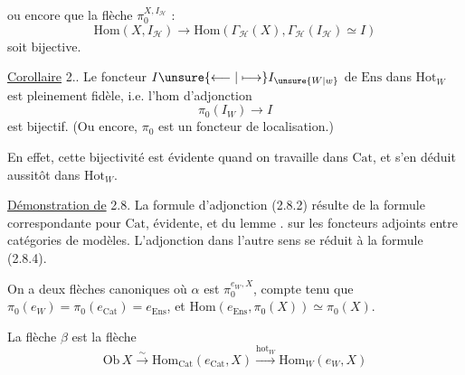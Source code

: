 
ou encore que la flèche $\pi_0^{X,I_{\mathcal H}}$ :
\[
\mathrm{Hom}(X,I_{\mathcal H})\longrightarrow\mathrm{Hom}(\Gamma_{\mathcal H}(X),\Gamma_{\mathcal H}(I_{\mathcal H})\simeq I)
\]
soit bijective.

\uline{Corollaire} 2..  Le foncteur $I\unsure{\longleftarrow|\longmapsto}I_{\unsure{W|w}}$ de $\mathrm{Ens}$ dans $\mathrm{Hot}_W$ est pleinement fidèle, i.e. l'hom d'adjonction
\[
\pi_0(I_W)\longrightarrow I
\]
est bijectif. (Ou encore, $\pi_0$ est un foncteur de localisation.)

En effet, cette bijectivité est  évidente quand on travaille dans $\mathrm{Cat}$, et s'en déduit aussitôt  dans $\mathrm{Hot}_W$.

\uline{Démonstration de} 2.8. La formule d'adjonction (2.8.2) résulte de la formule correspondante pour $\mathrm{Cat}$, évidente, et du lemme . sur les foncteurs adjoints entre catégories de modèles. L'adjonction dans l'autre sens se réduit à la formule (2.8.4).

On a deux flèches canoniques
où $\alpha$ est $\pi_0^{e_W,X}$, compte tenu que $\pi_0(e_W)=\pi_0(e_{\mathrm{Cat}})=e_{\mathrm{Ens}}$, et $\mathrm{Hom}(e_{\mathrm{Ens}},\pi_0(X))\simeq\pi_0(X)$.

La flèche $\beta$ est  la flèche 
\[
\mathrm{Ob}\,X\xrightarrow{\sim}\mathrm{Hom}_{\mathrm{Cat}}(e_{\mathrm{Cat}},X)\xrightarrow{\mathrm{hot}_W}\mathrm{Hom}_W(e_W,X)
\]
